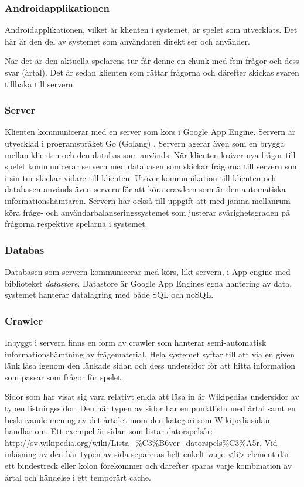 \documentclass[12pt,a4paper]{article}
\begin{document}
\subsubsection{Androidapplikationen}
Androidapplikationen, vilket är klienten i systemet, är spelet som utvecklats. Det här är den del av systemet som användaren direkt ser och använder.

När det är den aktuella spelarens tur får denne en chunk med fem frågor och dess svar (årtal). Det är sedan klienten som rättar frågorna och därefter skickas svaren tillbaka till servern.
\subsubsection{Server}
Klienten kommunicerar med en server som körs i Google App Engine. Servern är utvecklad i programspråket Go (Golang) \cite{golang}. Servern agerar även som en brygga mellan klienten och den databas som används. När klienten kräver nya frågor till spelet kommunicerar servern med databasen som skickar frågorna till servern som i sin tur skickar vidare till klienten. Utöver kommunikation till klienten och databasen används även servern för att köra crawlern som är den automatiska informationshämtaren. Servern har också till uppgift att med jämna mellanrum köra fråge- och användarbalanseringssystemet som justerar svårighetsgraden på frågorna respektive spelarna i systemet. 
\subsubsection{Databas}
Databasen som servern kommunicerar med körs, likt servern, i App engine med biblioteket \textit{datastore}. Datastore är Google App Engines egna hantering av data, systemet hanterar datalagring med både SQL och noSQL.
\subsubsection{Crawler}
Inbyggt i servern finns en form av crawler som hanterar semi-automatisk informationshämtning av frågematerial. Hela systemet syftar till att via en given länk läsa igenom den länkade sidan och dess undersidor för att hitta information som passar som frågor för spelet. 

Sidor som har visat sig vara relativt enkla att läsa in är Wikipedias undersidor av typen listningssidor. Den här typen av sidor har en punktlista med årtal samt en beskrivande mening av det årtalet inom den kategori som Wikipediasidan handlar om. Ett exempel är sidan som listar datorspelsår: \url{http://sv.wikipedia.org/wiki/Lista_%C3%B6ver_datorspels%C3%A5r}. Vid inläsning av den här typen av sida separeras helt enkelt varje <li>-element där ett bindestreck eller kolon förekommer och därefter sparas varje kombination av årtal och händelse i ett temporärt cache.
\end{document}
